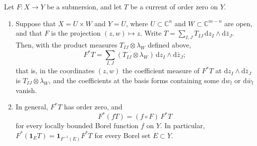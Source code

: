 \begin{corollary}\label{cor:order-zero-current-pullback}
Let $F\colon X\to Y$ be a submersion, and let $T$ be a current of order zero on $Y$.
\begin{enumerate}
\item Suppose that $X=U\times W$ and $Y=U$, where $U\subset\mathbb C^n$ and $W\subset\mathbb C^{m-n}$ are open, and that $F$ is the projection $(z,w)\mapsto z$. Write $T=\sum_{I,J}T_{IJ}\,\mathrm dz_I\wedge\mathrm d\bar z_J$. Then, with the product measures $T_{IJ}\otimes\lambda_W$ defined above,
\[
 F^*T=\sum_{I,J}(T_{IJ}\otimes\lambda_W)\,\mathrm dz_I\wedge\mathrm d\bar z_J;
\]
that is, in the coordinates $(z,w)$ the coefficient measure of $F^*T$ at $\mathrm dz_I\wedge\mathrm d\bar z_J$ is $T_{IJ}\otimes\lambda_W$, and the coefficients at the basis forms containing some $\mathrm dw_l$ or $\mathrm d\bar w_l$ vanish.
\item In general, $F^*T$ has order zero, and
\[
 F^*(fT)=(f\circ F)\,F^*T
\]
for every locally bounded Borel function $f$ on $Y$. In particular, $F^*(\mathbf 1_ET)=\mathbf 1_{F^{-1}(E)}F^*T$ for every Borel set $E\subset Y$.
\end{enumerate}
\end{corollary}

